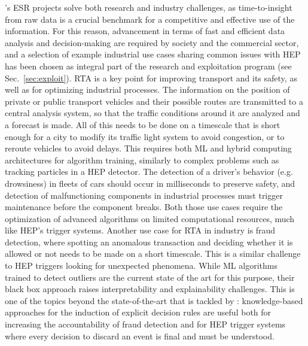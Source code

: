 \acronym's ESR projects solve both research and industry challenges, as time-to-insight from raw data is a crucial benchmark for a competitive and effective use of the information. For this reason, advancement in terms of fast and efficient data analysis and decision-making are required by society and the commercial sector, and a selection of example industrial use cases sharing common issues with HEP has been chosen as integral part of the \acronym research and exploitation program (see Sec.~\ref{sec:exploit}).  
RTA is a key point for improving transport and its safety, as well as for optimizing industrial processes. 
The information on the position of private or public transport vehicles and their possible routes are transmitted to a central analysis system, so that the traffic conditions around it are analyzed and a forecast is made. 
All of this needs to be done on a timescale that is short enough for a city to modify its traffic light system to avoid congestion, or to reroute vehicles to avoid delays. 
This requires both ML and hybrid computing architectures for algorithm training, similarly to complex problems such as tracking particles in a HEP detector. 
The detection of a driver's behavior (e.g. drowsiness) in fleets of cars should occur in milliseconds to preserve safety, and detection of malfunctioning components in industrial processes must trigger maintenance before the component breaks. Both those use cases require the optimization of advanced algorithms on limited computational resources, much like HEP's trigger systems.
Another use case for RTA in industry is fraud detection, where spotting an anomalous transaction and deciding whether it is allowed or not needs to be made on a short timescale. This is a similar challenge to HEP triggers looking for unexpected phenomena. 
While ML algorithms trained to detect outliers are the current state of the art for this purpose, their black box approach raises interpretability and explainability challenges. 
This is one of the topics beyond the state-of-the-art that is tackled by \acronym: knowledge-based approaches for the induction of explicit decision rules are useful both for increasing the accountability of fraud detection and for HEP trigger systems where every decision to discard an event is final and must be understood.\\
\vskip1pt
\noindent
{}
